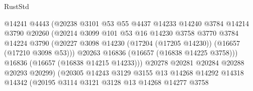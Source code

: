 \begin{lexlean}{RustStd}
\begin{coremodule}
                                    @14241
                                    @4443
                                    (@20238
                                      @3101
                                      @53
                                      @55
                                      @4437
                                      @14233
                                      @14240
                                      @3784
                                      @14214
                                      @3790
                                      @20260
                                      (@20214
                                        @3099
                                        @101
                                        @53
                                        @16
                                        @14230
                                        @3758
                                        @3770
                                        @3784
                                        @14224
                                        @3790
                                        (@20227
                                          @3098
                                          @14230
                                          (@17204 (@17205 @14230))
                                          (@16657 (@17210 @3098 @53)))
                                        @20263
                                        @16836
                                        (@16657 (@16838 @14225 @3758)))
                                      @16836
                                      (@16657 (@16838 @14215 @14233)))
                                    @20278
                                    @20281
                                    @20284
                                    @20288
                                    @20293
                                    @20299)
                                  (@20305
                                    @14243
                                    @3129
                                    @3155
                                    @13
                                    @14268
                                    @14292
                                    @14318
                                    @14342
                                    (@20195
                                      @3114
                                      @3121
                                      @3128
                                      @13
                                      @14268
                                      @14277
                                      @3758

\end{coremodule}
\end{lexlean}
